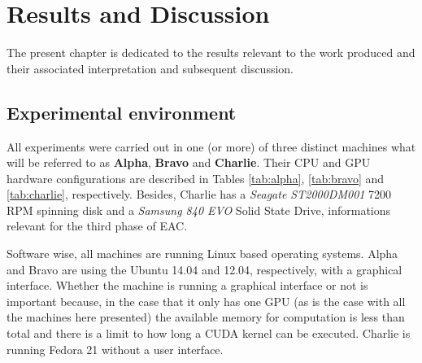 


\chapter{Results and Discussion}
\label{chapter:results}

The present chapter is dedicated to the results relevant to the work produced and their associated interpretation and subsequent discussion.

%

%
%

\section{Experimental environment}
\label{sec:system configs}

All experiments were carried out in one (or more) of three distinct machines what will be referred to as \textbf{Alpha}, \textbf{Bravo} and \textbf{Charlie}.
Their CPU and GPU hardware configurations are described in Tables \ref{tab:alpha}, \ref{tab:bravo} and \ref{tab:charlie}, respectively.
Besides, Charlie has a \emph{Seagate ST2000DM001} 7200 RPM spinning disk and a \emph{Samsung 840 EVO} Solid State Drive, informations relevant for the third phase of EAC.%

Software wise, all machines are running Linux based operating systems.
Alpha and Bravo are using the Ubuntu 14.04 and 12.04, respectively, with a graphical interface.
Whether the machine is running a graphical interface or not is important because, in the case that it only has one GPU (as is the case with all the machines here presented) the available memory for computation is less than total and there is a limit to how long a CUDA kernel can be executed.
Charlie is running Fedora 21 without a user interface.

